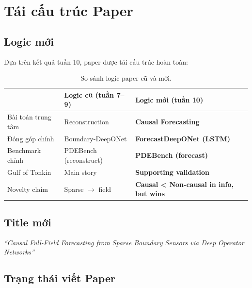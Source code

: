 \documentclass[12pt,a4paper]{article}
\begin{document}
\section{Tái cấu trúc Paper}

\subsection{Logic mới}

Dựa trên kết quả tuần 10, paper được tái cấu trúc hoàn toàn:

\begin{table}[ht]
  \centering
  \caption{So sánh logic paper cũ và mới.}
  \label{tab:paper_logic}
  \begin{tabular}{@{}lll@{}}
    \toprule
    & \textbf{Logic cũ (tuần 7--9)} & \textbf{Logic mới (tuần 10)} \\
    \midrule
    Bài toán trung tâm & Reconstruction & \textbf{Causal Forecasting} \\
    Đóng góp chính & Boundary-DeepONet & \textbf{ForecastDeepONet (LSTM)} \\
    Benchmark chính & PDEBench (reconstruct) & \textbf{PDEBench (forecast)} \\
    Gulf of Tonkin & Main story & \textbf{Supporting validation} \\
    Novelty claim & Sparse $\to$ field & \textbf{Causal < Non-causal in info, but wins} \\
    \bottomrule
  \end{tabular}
\end{table}

\subsection{Title mới}

\begin{center}
\textit{``Causal Full-Field Forecasting from Sparse Boundary Sensors via Deep Operator Networks''}
\end{center}

\subsection{Trạng thái viết Paper}
\end{document}
